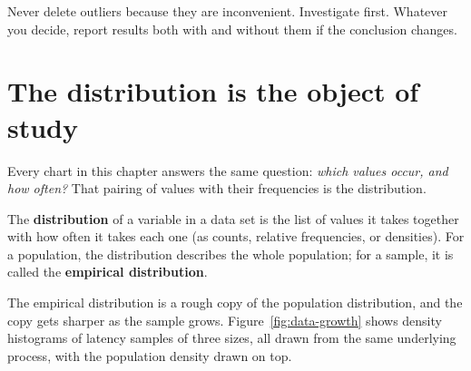 \begin{trapbox}
Never delete outliers because they are inconvenient. Investigate first. Whatever you
decide, report results both with and without them if the conclusion changes.
\end{trapbox}

\section{The distribution is the object of study}
\label{sec:data-distribution}

Every chart in this chapter answers the same question: \emph{which values occur, and how
often?} That pairing of values with their frequencies is the distribution.

\begin{definition}
The \textbf{distribution} of a variable in a data set is the list of values it takes together
with how often it takes each one (as counts, relative frequencies, or densities). For a
population, the distribution describes the whole population; for a sample, it is called the
\textbf{empirical distribution}.
\end{definition}

The empirical distribution is a rough copy of the population distribution, and the copy gets
sharper as the sample grows. Figure~\ref{fig:data-growth} shows density histograms of latency
samples of three sizes, all drawn from the same underlying process, with the population density
drawn on top.

